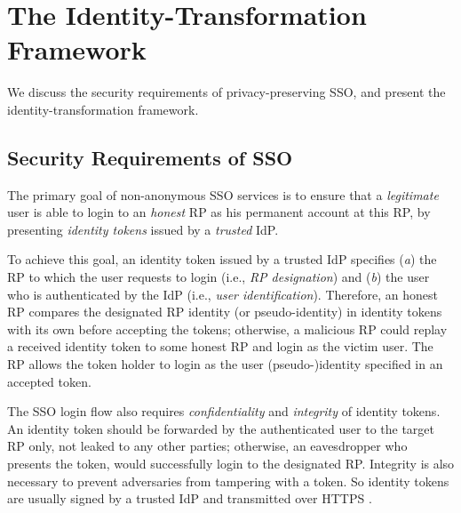 \section{The Identity-Transformation Framework}
\label{sec:challenge}

We discuss the security requirements of privacy-preserving SSO,
 and present the identity-transformation framework.


\subsection{Security Requirements of SSO}
\label{subsec:basicrequirements}

The primary goal of non-anonymous SSO services \cite{OpenIDConnect,rfc6749,SAML,SAMLIdentifier,NIST2017draft} is %
 to ensure that a \emph{legitimate} user is able to login to an \emph{honest} RP as his permanent account at this RP, %
    by presenting \emph{identity tokens} issued by a \emph{trusted} IdP.

To achieve this goal,
 an identity token issued by a trusted IdP \cite{OpenIDConnect,rfc6749,SAML,SAMLIdentifier,NIST2017draft} specifies (\emph{a}) the RP to which the user requests to login (i.e., \emph{RP designation})
    and  (\emph{b}) the user who is authenticated by the IdP (i.e., \emph{user identification}).
Therefore,
    an honest RP compares the designated RP identity (or pseudo-identity) in identity tokens with its own before accepting the tokens;
     otherwise,
        a malicious RP could replay a received identity token to some honest RP and login as the victim user.
The RP allows the token holder to login as the user (pseudo-)identity specified in an accepted token.

The SSO login flow also requires \emph{confidentiality} and \emph{integrity} of identity tokens.
An identity token should be forwarded by the authenticated user to the target RP only,
    not leaked to any other parties;
        otherwise, an eavesdropper who presents the token, would successfully login to the designated RP.
Integrity is also necessary
    to prevent adversaries from tampering with a token.
So identity tokens are usually signed by a trusted IdP and transmitted over HTTPS \cite{OpenIDConnect,rfc6749,SAML}.


